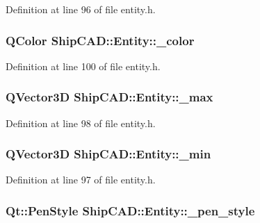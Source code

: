 Definition at line 96 of file entity.\-h.

\hypertarget{classShipCAD_1_1Entity_a150a19aa958886e9dcf7c4e0e51dcd98}{
\subsubsection[{\-\_\-color}]{\setlength{\rightskip}{0pt plus 5cm}Q\-Color Ship\-C\-A\-D\-::\-Entity\-::\-\_\-color\hspace{0.3cm}{\ttfamily [protected]}}}\label{classShipCAD_1_1Entity_a150a19aa958886e9dcf7c4e0e51dcd98}


Definition at line 100 of file entity.\-h.

\hypertarget{classShipCAD_1_1Entity_a30e4f9cb421987cebd07737a554275eb}{
\subsubsection[{\-\_\-max}]{\setlength{\rightskip}{0pt plus 5cm}Q\-Vector3\-D Ship\-C\-A\-D\-::\-Entity\-::\-\_\-max\hspace{0.3cm}{\ttfamily [protected]}}}\label{classShipCAD_1_1Entity_a30e4f9cb421987cebd07737a554275eb}


Definition at line 98 of file entity.\-h.

\hypertarget{classShipCAD_1_1Entity_a414d4ff1ee308d47a5052910c3b34f7b}{
\subsubsection[{\-\_\-min}]{\setlength{\rightskip}{0pt plus 5cm}Q\-Vector3\-D Ship\-C\-A\-D\-::\-Entity\-::\-\_\-min\hspace{0.3cm}{\ttfamily [protected]}}}\label{classShipCAD_1_1Entity_a414d4ff1ee308d47a5052910c3b34f7b}


Definition at line 97 of file entity.\-h.

\hypertarget{classShipCAD_1_1Entity_ac53123be976cd9739ad1657573d67d97}{
\subsubsection[{\-\_\-pen\-\_\-style}]{\setlength{\rightskip}{0pt plus 5cm}Qt\-::\-Pen\-Style Ship\-C\-A\-D\-::\-Entity\-::\-\_\-pen\-\_\-style\hspace{0.3cm}{\ttfamily [protected]}}}\label{classShipCAD_1_1Entity_ac53123be976cd9739ad1657573d67d97}


